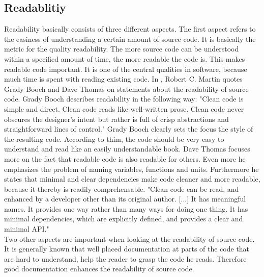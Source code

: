 \subsection*{Readablitiy}
\label{readability}
Readability basically consists of three different aspects. 
The first aspect refers to the easiness of understanding a certain amount of source code. It is basically the metric for the quality readability.  The more source code can be understood within a specified amount of time, the more readable the code is. This makes readable code important. It is one of the central qualities in software, because much time is spent with reading existing code. In \cite{cc}, Robert C. Martin quotes Grady Booch and Dave Thomas on statements about the readability of source code. Grady Booch describes readability in the following way: "Clean code is simple and direct. Clean code reads like well-written prose. Clean code never obscures the designer’s intent but rather is full of crisp abstractions and straightforward lines of control." \cite[p. 8]{cc} Grady Booch clearly sets the focus the style of the resulting code. According to thim, the code should be very easy to understand and read like an easily understandable book. Dave Thomas focuses more on the fact that readable code is also readable for others. Even more he emphasizes the problem of naming variables, functions and units. Furthermore he states that minimal and clear dependencies make code cleaner and more readable, because it thereby is readily comprehensable. "Clean code can be read, and enhanced by a developer other than its original author. [...] It has meaningful names. It  provides one way rather than many ways for doing one thing. It has minimal dependencies, which are explicitly defined, and provides a clear and minimal  API." \cite[p. 9]{cc} \\

Two other aspects are important when looking at the readability of source code. It is generally known that well placed documentation at parts of the code that are hard to understand, help the reader to grasp the code he reads. Therefore good documentation enhances the readability of source code.\\

